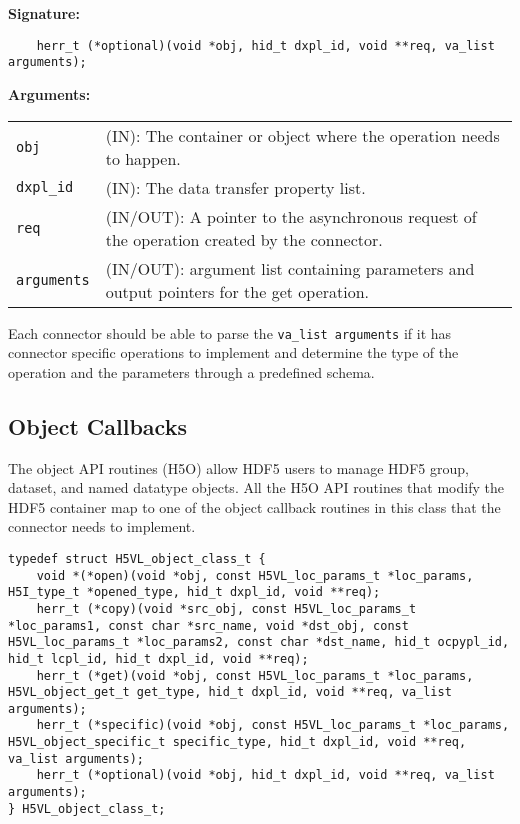 \begin{mdframed}[style=bgbox]
\textbf{Signature:}
\begin{lstlisting}
    herr_t (*optional)(void *obj, hid_t dxpl_id, void **req, va_list arguments);
\end{lstlisting}

\textbf{Arguments:}\\
\begin{tabular}{l p{13.5cm}}
  \texttt{obj} & (IN): The container or object where the operation needs to happen.\\
  \texttt{dxpl\_id} & (IN): The data transfer property list.\\
  \texttt{req} & (IN/OUT): A pointer to the asynchronous request of the operation created by the connector.\\
  \texttt{arguments} & (IN/OUT): argument list containing parameters and output pointers for the get operation. \\
\end{tabular}
\end{mdframed}

Each connector should be able to parse the \texttt{va\_list arguments} if it has connector specific operations to implement and determine the type of the operation and the parameters through a predefined schema. 


\subsection{Object Callbacks}
The object API routines (H5O) allow HDF5 users to manage HDF5 group,
dataset, and named datatype objects. All the H5O API routines that
modify the HDF5 container map to one of the object callback routines
in this class that the connector needs to implement.

\begin{lstlisting}[caption={Structure for object callback routines, H5VLconnector.h}, captionpos=b, label={lst:H5Oclass}]
typedef struct H5VL_object_class_t {                                             
    void *(*open)(void *obj, const H5VL_loc_params_t *loc_params, H5I_type_t *opened_type, hid_t dxpl_id, void **req);                                    
    herr_t (*copy)(void *src_obj, const H5VL_loc_params_t *loc_params1, const char *src_name, void *dst_obj, const H5VL_loc_params_t *loc_params2, const char *dst_name, hid_t ocpypl_id, hid_t lcpl_id, hid_t dxpl_id, void **req);   
    herr_t (*get)(void *obj, const H5VL_loc_params_t *loc_params, H5VL_object_get_t get_type, hid_t dxpl_id, void **req, va_list arguments);                 
    herr_t (*specific)(void *obj, const H5VL_loc_params_t *loc_params, H5VL_object_specific_t specific_type, hid_t dxpl_id, void **req, va_list arguments);            
    herr_t (*optional)(void *obj, hid_t dxpl_id, void **req, va_list arguments); 
} H5VL_object_class_t; 
\end{lstlisting}

